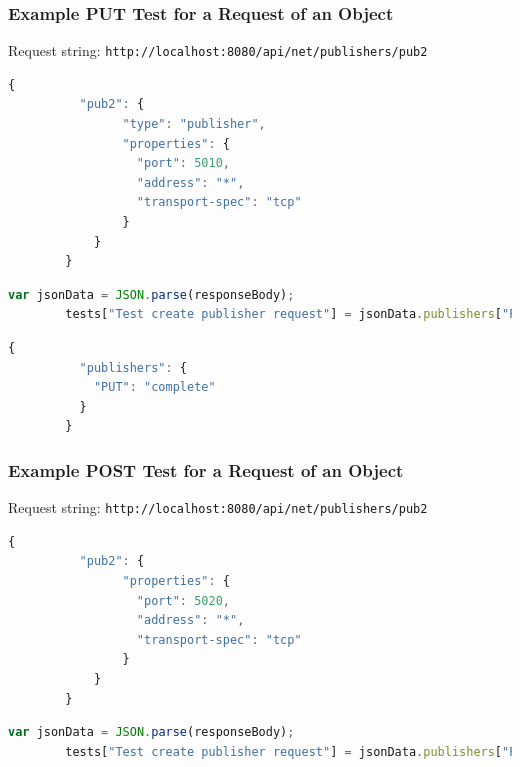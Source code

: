     \subsubsection{Example PUT Test for a Request of an Object}\label{sec:test-rest-put}

      Request string: \texttt{http://localhost:8080/api/net/publishers/pub2}

      \begin{lstlisting}[language=Javascript,title=PUT Object Request Body,nolol]
        {
          "pub2": {
                "type": "publisher",
                "properties": {
                  "port": 5010,
                  "address": "*",
                  "transport-spec": "tcp"
                }
            }
        }
      \end{lstlisting}

      \begin{lstlisting}[language=Javascript,title=PUT Object Tests,nolol]
        var jsonData = JSON.parse(responseBody);
        tests["Test create publisher request"] = jsonData.publishers["PUT"] === "complete";
      \end{lstlisting}

      \begin{lstlisting}[language=Javascript,title=PUT Object Response,nolol]
        {
          "publishers": {
            "PUT": "complete"
          }
        }
      \end{lstlisting}

    \subsubsection{Example POST Test for a Request of an Object}\label{sec:test-rest-post}

      Request string: \texttt{http://localhost:8080/api/net/publishers/pub2}

      \begin{lstlisting}[language=Javascript,title=POST Object Request Body,nolol]
        {
          "pub2": {
                "properties": {
                  "port": 5020,
                  "address": "*",
                  "transport-spec": "tcp"
                }
            }
        }
      \end{lstlisting}

      \begin{lstlisting}[language=Javascript,title=POST Object Tests,nolol]
        var jsonData = JSON.parse(responseBody);
        tests["Test create publisher request"] = jsonData.publishers["POST"] === "complete";
      \end{lstlisting}


